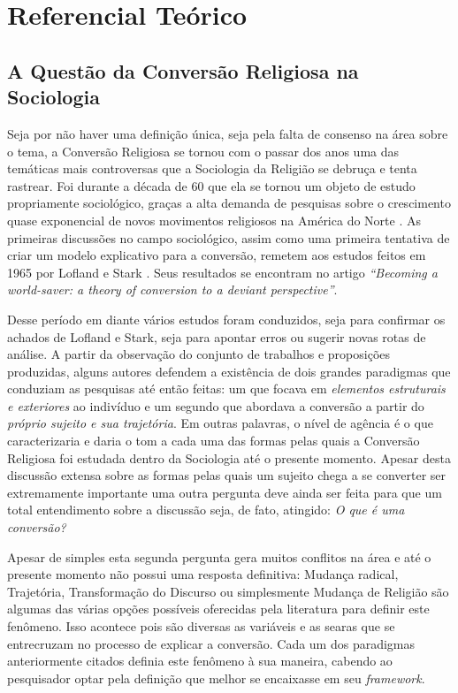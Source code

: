 \documentclass[
	12pt,				%
	oneside,			%
	a4paper,			%
	sumario=tradicional,
	english,			%
	brazil				%
	]{abntex2}
\begin{document}
\hypertarget{referencial-teuxf3rico}{%
\chapter{Referencial Teórico}\label{referencial-teuxf3rico}}

\hypertarget{a-questuxe3o-da-conversuxe3o-religiosa-na-sociologia}{%
\section{A Questão da Conversão Religiosa na Sociologia}\label{a-questuxe3o-da-conversuxe3o-religiosa-na-sociologia}}

Seja por não haver uma definição única, seja pela falta de consenso na área sobre o tema, a Conversão Religiosa se tornou com o passar dos anos uma das temáticas mais controversas que a Sociologia da Religião se debruça e tenta rastrear. Foi durante a década de 60 que ela se tornou um objeto de estudo propriamente sociológico, graças a alta demanda de pesquisas sobre o crescimento quase exponencial de novos movimentos religiosos na América do Norte \autocite[167]{snow_sociology_1984}. As primeiras discussões no campo sociológico, assim como uma primeira tentativa de criar um modelo explicativo para a conversão, remetem aos estudos feitos em 1965 por Lofland e Stark \autocite{stark_acts_2000-1}. Seus resultados se encontram no artigo \emph{``Becoming a world-saver: a theory of conversion to a deviant perspective''}.

Desse período em diante vários estudos foram conduzidos, seja para confirmar os achados de Lofland e Stark, seja para apontar erros ou sugerir novas rotas de análise. A partir da observação do conjunto de trabalhos e proposições produzidas, alguns autores defendem a existência de dois grandes paradigmas que conduziam as pesquisas até então feitas: um que focava em \emph{elementos estruturais e exteriores} ao indivíduo e um segundo que abordava a conversão a partir do \emph{próprio sujeito e sua trajetória}. Em outras palavras, o nível de agência é o que caracterizaria e daria o tom a cada uma das formas pelas quais a Conversão Religiosa foi estudada dentro da Sociologia até o presente momento. Apesar desta discussão extensa sobre as formas pelas quais um sujeito chega a se converter ser extremamente importante uma outra pergunta deve ainda ser feita para que um total entendimento sobre a discussão seja, de fato, atingido: \emph{O que é uma conversão?}

Apesar de simples esta segunda pergunta gera muitos conflitos na área e até o presente momento não possui uma resposta definitiva: Mudança radical, Trajetória, Transformação do Discurso ou simplesmente Mudança de Religião são algumas das várias opções possíveis oferecidas pela literatura para definir este fenômeno. Isso acontece pois são diversas as variáveis e as searas que se entrecruzam no processo de explicar a conversão. Cada um dos paradigmas anteriormente citados definia este fenômeno à sua maneira, cabendo ao pesquisador optar pela definição que melhor se encaixasse em seu \emph{framework}.
\end{document}
